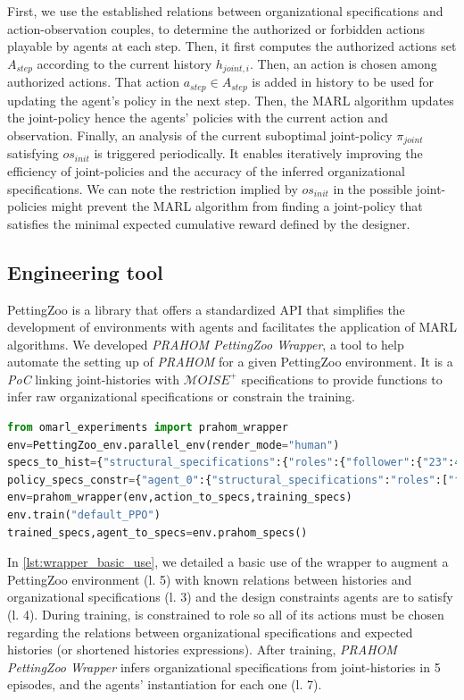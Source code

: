 \documentclass[runningheads]{llncs}
\newcounter{relation}
\begin{document}
First, we use the established relations between organizational specifications and action-observation couples, to determine the authorized or forbidden actions playable by agents at each step.
Then, it first computes the authorized actions set $A_{step}$ according to the current history $h_{joint,i}$. Then, an action is chosen among authorized actions. That action $a_{step} \in A_{step}$ is added in history to be used for updating the agent's policy in the next step. Then, the MARL algorithm updates the joint-policy hence the agents' policies with the current action and observation.
Finally, an analysis of the current suboptimal joint-policy $\pi_{joint}$ satisfying $os_{init}$ is triggered periodically. It enables iteratively improving the efficiency of joint-policies and the accuracy of the inferred organizational specifications.
We can note the restriction implied by $os_{init}$ in the possible joint-policies might prevent the MARL algorithm from finding a joint-policy that satisfies the minimal expected cumulative reward defined by the designer.

\subsection{Engineering tool}

PettingZoo is a library that offers a standardized API that simplifies the development of environments with agents and facilitates the application of MARL algorithms.
We developed \emph{PRAHOM PettingZoo Wrapper}\label{PettingZoo-wrapper}, a tool to help automate the setting up of \emph{PRAHOM} for a given PettingZoo environment.
It is a \emph{PoC} linking joint-histories with $\mathcal{M}OISE^+$ specifications to provide functions to infer raw organizational specifications or constrain the training. %
%
\begin{lstlisting}[language=Python, caption=PRAHOM PettingZoo Wrapper basic use, label={lst:wrapper_basic_use}]
from omarl_experiments import prahom_wrapper
env=PettingZoo_env.parallel_env(render_mode="human")
specs_to_hist={"structural_specifications":{"roles":{"follower":{"23":41,"14":[74,0]}}...},"functional_specifications":{"links":{"(leader,follower,aut)":".*14.*?89"}...}...}
policy_specs_constr={"agent_0":{"structural_specifications":"roles":["follower"]}}
env=prahom_wrapper(env,action_to_specs,training_specs)
env.train("default_PPO")
trained_specs,agent_to_specs=env.prahom_specs()
\end{lstlisting}
%
In \autoref{lst:wrapper_basic_use}, we detailed a basic use of the wrapper to augment a PettingZoo environment (l. 5) with known relations between histories and organizational specifications (l. 3) and the design constraints agents are to satisfy (l. 4).
During training,  is constrained to role  so all of its actions must be chosen regarding the relations between organizational specifications and expected histories (or shortened histories expressions).
After training, \emph{PRAHOM PettingZoo Wrapper} infers organizational specifications from joint-histories in 5 episodes, and the agents' instantiation for each one (l. 7).
\end{document}
